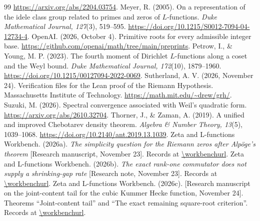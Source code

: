 \begin{thebibliography}{99}
\url{https://arxiv.org/abs/2204.03754}.
Meyer, R. (2005). On a representation of the idele class group related
to primes and zeros of $L$-functions. \emph{Duke Mathematical Journal,
127}(3), 519--595. \url{https://doi.org/10.1215/S0012-7094-04-12734-4}.
OpenAI. (2026, October 4). Primitive roots for every admissible
integer base. \url{https://github.com/openai/math/tree/main/preprints}.
Petrow, I., \& Young, M. P. (2023). The fourth moment of Dirichlet
$L$-functions along a coset and the Weyl bound.
\emph{Duke Mathematical Journal, 172}(10), 1879--1960.
\url{https://doi.org/10.1215/00127094-2022-0069}.
Sutherland, A. V. (2026, November 24). Verification files for the
Lean proof of the Riemann Hypothesis. Massachusetts Institute of
Technology. \url{https://math.mit.edu/~drew/grh/}.
Suzuki, M. (2026). Spectral convergence associated with Weil's
quadratic form. \url{https://arxiv.org/abs/2610.32704}.
Thorner, J., \& Zaman, A. (2019).
A unified and improved Chebotarev density theorem.
\emph{Algebra \& Number Theory, 13}(5), 1039--1068.
\url{https://doi.org/10.2140/ant.2019.13.1039}.
Zeta and L-functions Workbench. (2026a).
\emph{The simplicity question for the Riemann zeros after Alp\"oge's theorem}
[Research manuscript, November 23]. Records at \url{\workbenchurl}.
Zeta and L-functions Workbench. (2026b).
\emph{The exact rank-one commutator does not supply a shrinking-gap rate}
[Research note, November 23]. Records at \url{\workbenchurl}.
Zeta and L-functions Workbench. (2026c).
[Research manuscript on the joint-content tail for the cubic Kummer
Hecke function, November 24]. Theorems ``Joint-content tail'' and
``The exact remaining square-root criterion''.
Records at \url{\workbenchurl}.
\end{thebibliography}
